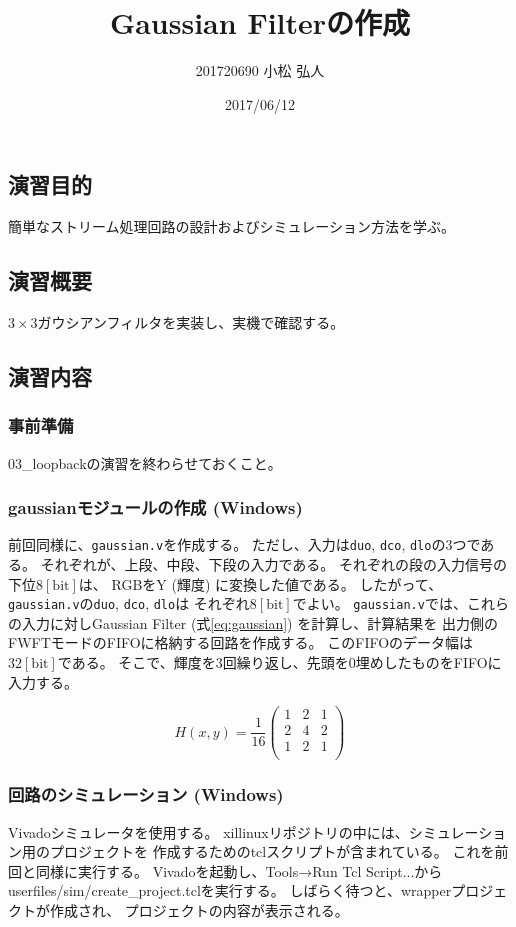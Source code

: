 \documentclass[11pt]{jsarticle}
\title{Gaussian Filterの作成}
\author{201720690 小松 弘人}
\date{2017/06/12}
\begin{document}
\maketitle
\subsection*{演習目的}
簡単なストリーム処理回路の設計およびシミュレーション方法を学ぶ。

\subsection*{演習概要}
$3\!\times\!3$ガウシアンフィルタを実装し、実機で確認する。

\subsection*{演習内容}
\subsubsection*{事前準備}
03\_loopbackの演習を終わらせておくこと。

\subsubsection*{gaussianモジュールの作成 (Windows)}
前回同様に、\verb|gaussian.v|を作成する。
ただし、入力は\verb|duo|, \verb|dco|, \verb|dlo|の3つである。
それぞれが、上段、中段、下段の入力である。
それぞれの段の入力信号の下位$8\mathrm{[bit]}$は、
RGBをY (輝度) に変換した値である。
したがって、\verb|gaussian.v|の\verb|duo|, \verb|dco|, \verb|dlo|は
それぞれ$8\mathrm{[bit]}$でよい。
\verb|gaussian.v|では、これらの入力に対しGaussian Filter
(式\ref{eq:gaussian}) を計算し、計算結果を
出力側のFWFTモードのFIFOに格納する回路を作成する。
このFIFOのデータ幅は$32\mathrm{[bit]}$である。
そこで、輝度を3回繰り返し、先頭を0埋めしたものをFIFOに入力する。

\begin{equation}
	\label{eq:gaussian}
	H(x, y)\!=\!\frac{1}{16}\!\left(
	\begin{array}{ccc}
		1 & 2 & 1 \\
		2 & 4 & 2 \\
		1 & 2 & 1 \\
	\end{array}
	\right)
\end{equation}

\subsubsection*{回路のシミュレーション (Windows)}
Vivadoシミュレータを使用する。
xillinuxリポジトリの中には、シミュレーション用のプロジェクトを
作成するためのtclスクリプトが含まれている。
これを前回と同様に実行する。
Vivadoを起動し、Tools→Run Tcl Script...から
userfiles/sim/create\_project.tclを実行する。
しばらく待つと、wrapperプロジェクトが作成され、
プロジェクトの内容が表示される。
\end{document}
